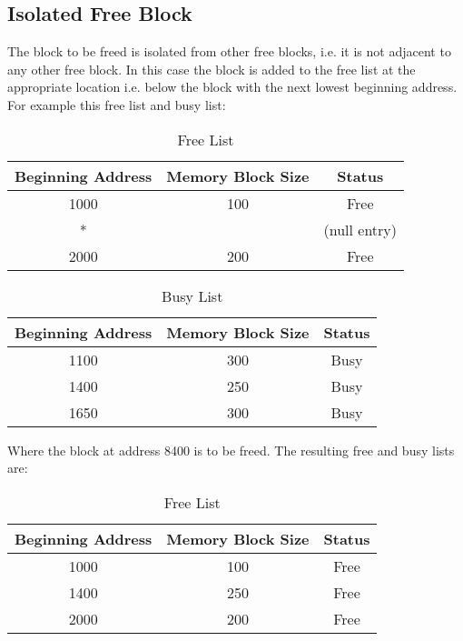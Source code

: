 \documentclass[12pt letter]{report}
\begin{document}
\subsection{Isolated Free Block}
The block to be freed is isolated from other free blocks, i.e. it is not adjacent to any other free block. In this case the block is added to the free list at the appropriate location i.e. below the block with the next lowest beginning address. For example this free list and busy list:
\begin{table}[H]
  \caption{Free List}
  \begin{center}
    \begin{tabular}{|c c c|}
      \hline
      Beginning Address & Memory Block Size & Status       \\ [0.5ex]
      \hline
      \hline
      1000              & 100               & Free         \\
      *                 &                   & (null entry) \\
      2000              & 200               & Free         \\
      \hline
    \end{tabular}
  \end{center}
\end{table}

\begin{table}[H]
  \caption{Busy List}
  \begin{center}
    \begin{tabular}{|c c c|}
      \hline
      Beginning Address & Memory Block Size & Status \\ [0.5ex]
      \hline
      \hline
      1100              & 300               & Busy   \\
      1400              & 250               & Busy   \\
      1650              & 300               & Busy   \\
      \hline
    \end{tabular}
  \end{center}
\end{table}

Where the block at address 8400 is to be freed. The resulting free and busy lists are:
\begin{table}[H]
  \caption{Free List}
  \begin{center}
    \begin{tabular}{|c c c|}
      \hline
      Beginning Address & Memory Block Size & Status \\ [0.5ex]
      \hline
      \hline
      1000              & 100               & Free   \\
      1400              & 250               & Free   \\ %
      2000              & 200               & Free   \\
      \hline
    \end{tabular}
  \end{center}
\end{table}
\end{document}
